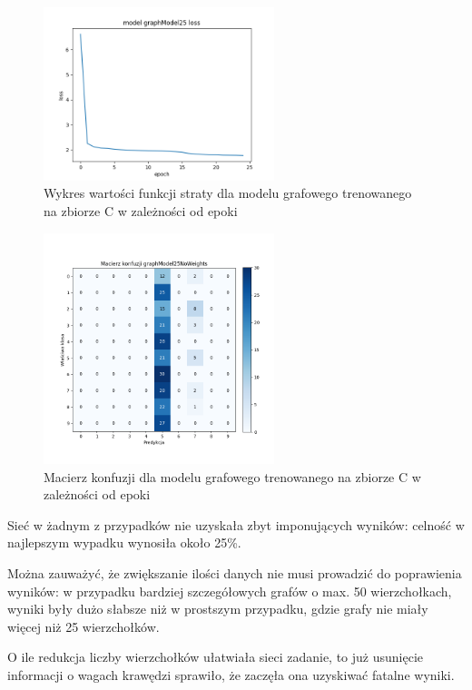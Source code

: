 \documentclass{article}
\begin{document}
\begin{figure}[H]
    \centering
    \includegraphics[width=0.6\textwidth]{../Saves/Graph/graphModel25_loss.png}
    \caption{Wykres wartości funkcji straty dla modelu grafowego trenowanego na zbiorze C w zależności od epoki} 
\end{figure}

\begin{figure}[H]
    \centering
    \includegraphics[width=0.6\textwidth]{../Saves/Graph/graphModel25NoWeights_confusion.png}
    \caption{Macierz konfuzji dla modelu grafowego trenowanego na zbiorze C w zależności od epoki} 
\end{figure}

Sieć w żadnym z przypadków nie uzyskała zbyt imponujących
wyników: celność w najlepszym wypadku wynosiła około 25\%.

Można zauważyć, że zwiększanie ilości danych nie musi
prowadzić do poprawienia wyników: w przypadku bardziej
szczegółowych grafów o max. 50 wierzchołkach, wyniki były
dużo słabsze niż w prostszym przypadku, gdzie grafy nie
miały więcej niż 25 wierzchołków.

O ile redukcja liczby wierzchołków ułatwiała sieci zadanie,
to już usunięcie informacji o wagach krawędzi sprawiło,
że zaczęła ona uzyskiwać fatalne wyniki.
\end{document}
